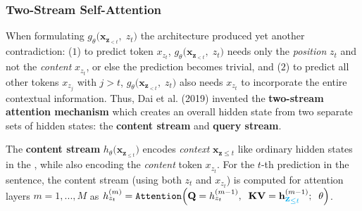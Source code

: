 \subsubsection{Two-Stream Self-Attention }\label{sec:TwoStreamSelfAttention}

When formulating $g_\theta \Big( \textbf{x}_{\textbf{z}_{< t}}, \; z_t \Big)$ the  architecture produced yet another contradiction: ($1$) to predict token $x_{z_t}$, $g_\theta \Big( \textbf{x}_{\textbf{z}_{< t}}, \; z_t \Big)$ needs only the \emph{position} $z_t$ and not the \emph{content} $x_{z_t}$, or else the prediction becomes trivial, and ($2$) to predict all other tokens $x_{z_j}$ with $j > t$,  $g_\theta \Big( \textbf{x}_{\textbf{z}_{< t}}, \; z_t \Big)$ also needs $x_{z_t}$ to incorporate the entire contextual information. Thus, Dai et al. (2019) invented the \textbf{two-stream attention mechanism} which creates an overall hidden state from two separate sets of hidden states: the \textbf{content stream} and \textbf{query stream}.


The \textbf{content stream} $h_\theta \Big( \textbf{x}_{\textbf{z}_{\leq t}} \Big)$ encodes \emph{context} $\textbf{x}_{\textbf{z} \leq t}$ like ordinary hidden states in the , while also encoding the \emph{content} token $x_{z_t}$. For the $t$-th prediction in the sentence, the content stream (using both $z_t$ and $x_{z_t}$) is computed for attention layers $m = 1, ..., M$ as $h_{z_t}^{(m)} = \texttt{Attention} \Big( \textbf{Q} = h_{z_t}^{(m-1)}, \;\; \textbf{KV} = \textbf{h}_{ {\color{cyan} \mathlarger{\mathlarger{\mathbf{z}_{\leq t}}}  } }^{(m-1)}; \;\; \theta  \Big)$.

%     
%     


